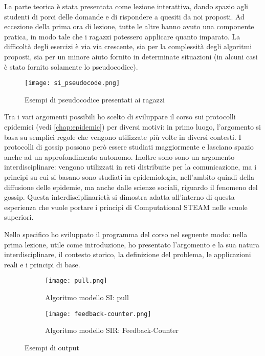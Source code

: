 La parte teorica è stata presentata come lezione interattiva, dando spazio agli studenti di porci delle domande e di rispondere a quesiti da noi proposti. Ad eccezione della prima ora di lezione, tutte le altre hanno avuto una componente pratica, in modo tale che i ragazzi potessero applicare quanto imparato. La difficoltà degli esercizi è via via crescente, sia per la complessità degli algoritmi proposti, sia per un minore aiuto fornito in determinate situazioni (in alcuni casi è stato fornito solamente lo pseudocodice). 

\begin{figure}[!ht]
    \centering
    \texttt{[image: si\_pseudocode.png]}
    \caption{Esempi di pseudocodice presentati ai ragazzi \cite{montresor}}
    \label{}
\end{figure}

Tra i vari argomenti possibili ho scelto di sviluppare il corso sui protocolli epidemici (vedi \autoref{chap:epidemic}) per diversi motivi: in primo luogo, l’argomento si basa su semplici regole che vengono utilizzate più volte in diversi contesti. I protocolli di gossip possono però essere studiati maggiormente e lasciano spazio anche ad un approfondimento autonomo. Inoltre sono sono un argomento interdisciplinare: vengono utilizzati in reti distribuite per la comunicazione, ma i principi su cui si basano sono studiati in epidemiologia, nell’ambito quindi della diffusione delle epidemie, ma anche dalle scienze sociali, riguardo il fenomeno del gossip. Questa interdisciplinarietà si dimostra adatta all’interno di questa esperienza che vuole portare i principi di Computational STEAM nelle scuole superiori.

Nello specifico ho sviluppato il programma del corso nel seguente modo: nella prima lezione, utile come introduzione, ho presentato l’argomento e la sua natura interdisciplinare, il contesto storico, la definizione del problema, le applicazioni reali e i principi di base.
\begin{figure}[!ht]
    
    \begin{subfigure}{.5\textwidth}
        \centering
        \texttt{[image: pull.png]}
        \captionsetup{justification=centering}
        \caption{Algoritmo modello SI: pull} 
    \end{subfigure}\hfill
    \begin{subfigure}{.5\textwidth}
        \centering
        \texttt{[image: feedback-counter.png]}
        \captionsetup{justification=centering}
        \caption{Algoritmo modello SIR: Feedback-Counter} 
    \end{subfigure}
    \caption{Esempi di output}
    \label{fig:output}
\end{figure} 

